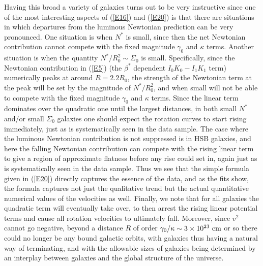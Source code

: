 \documentclass[preprint,aps]{revtex4}
\begin{document}
Having this broad a variety of  galaxies turns out to be very instructive since one of the most interesting aspects of (\ref{E16}) and (\ref{E20}) is that there are situations in which departures from the luminous Newtonian prediction can be very pronounced. One situation is when $N^*$ is small, since then the net Newtonian contribution cannot compete with the fixed magnitude $\gamma_0$ and $\kappa$ terms. Another situation is when the quantity $N^*/R_0^2\sim \Sigma_0$ is small.  Specifically, since the Newtonian contribution in (\ref{E5}) (the $\beta^*$ dependent $I_0K_0 - I_1K_1$ term) numerically peaks at around $R=2.2R_0$, the strength of the Newtonian term at the peak will be set by the magnitude of  $N^*/R_0^2$, and when small will not be able to compete with the fixed magnitude $\gamma_0$ and $\kappa $ terms. Since the linear term dominates over the quadratic one until the largest distances, in both small $N^*$ and/or small $\Sigma_0$ galaxies one should expect the rotation curves to start rising immediately, just as is systematically seen in the data sample. The case where the luminous Newtonian contribution is not suppressed is in HSB galaxies, and here the falling Newtonian contribution can compete with the rising linear term to give a region of approximate flatness before any rise could set in, again just as is systematically seen in the data sample. Thus we see that the simple formula given in (\ref{E20}) directly captures the essence of the data, and as the fits show, the formula captures not just the qualitative trend but the actual quantitative numerical values of the velocities as well. Finally, we note that for all galaxies the quadratic term will eventually take over, to then arrest the rising linear potential terms and cause all rotation velocities to ultimately fall. Moreover, since $v^2$ cannot go negative, beyond a distance $R$ of order $\gamma_0/\kappa \sim 3\times 10^{23}~{\rm cm}$ or so there could no longer be any bound galactic orbits, with galaxies thus having a natural way of terminating, and with the allowable sizes of galaxies being determined by an interplay between galaxies and the global structure of the universe.
\end{document}

